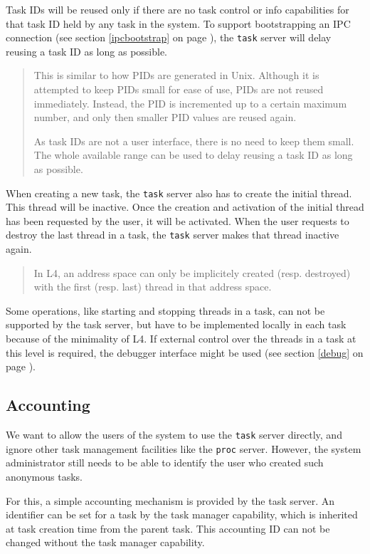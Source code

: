 \documentclass[9pt,a4paper]{extarticle}
\newenvironment{comment}{\footnotesize \begin{quote}}{\end{quote}}
\begin{document}
Task IDs will be reused only if there are no task control or info
capabilities for that task ID held by any task in the system.  To
support bootstrapping an IPC connection (see section
\ref{ipcbootstrap} on page \pageref{ipcbootstrap}), the \texttt{task}
server will delay reusing a task ID as long as possible.

\begin{comment}
  This is similar to how PIDs are generated in Unix.  Although it is
  attempted to keep PIDs small for ease of use, PIDs are not reused
  immediately.  Instead, the PID is incremented up to a certain
  maximum number, and only then smaller PID values are reused again.
  
  As task IDs are not a user interface, there is no need to keep them
  small.  The whole available range can be used to delay reusing a
  task ID as long as possible.
\end{comment}

When creating a new task, the \texttt{task} server also has to create
the initial thread.  This thread will be inactive.  Once the creation
and activation of the initial thread has been requested by the user,
it will be activated.  When the user requests to destroy the last
thread in a task, the \texttt{task} server makes that thread inactive
again.

\begin{comment}
  In L4, an address space can only be implicitely created (resp.
  destroyed) with the first (resp. last) thread in that address space.
\end{comment}

Some operations, like starting and stopping threads in a task, can not
be supported by the task server, but have to be implemented locally in
each task because of the minimality of L4.  If external control over
the threads in a task at this level is required, the debugger
interface might be used (see section \ref{debug} on page
\pageref{debug}).


\subsection{Accounting}

We want to allow the users of the system to use the \texttt{task}
server directly, and ignore other task management facilities like the
\texttt{proc} server.  However, the system administrator still needs
to be able to identify the user who created such anonymous tasks.

For this, a simple accounting mechanism is provided by the task
server.  An identifier can be set for a task by the task manager
capability, which is inherited at task creation time from the parent
task.  This accounting ID can not be changed without the task manager
capability.
\end{document}
